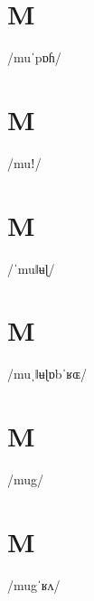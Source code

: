 \documentclass[10pt,a4paper,twoside]{book}
\begin{document}
\section*{M}

\begin{multicols}{3}
 {/muˈpɒɦ/} {}
\end{multicols}

\section*{M}

\begin{multicols}{3}
 {/muǃ/} {}
\end{multicols}

\section*{M}

\begin{multicols}{3}
 {/ˈmuǁʉɭ/} {}
\end{multicols}

\section*{M}

\begin{multicols}{3}
 {/muˌǁʉɭɒbˈʁɶ/} {}
\end{multicols}

\section*{M}

\begin{multicols}{3}
 {/mug/} {}
\end{multicols}

\section*{M}

\begin{multicols}{3}
 {/mugˈʁʌ/} {}
\end{multicols}
\end{document}
